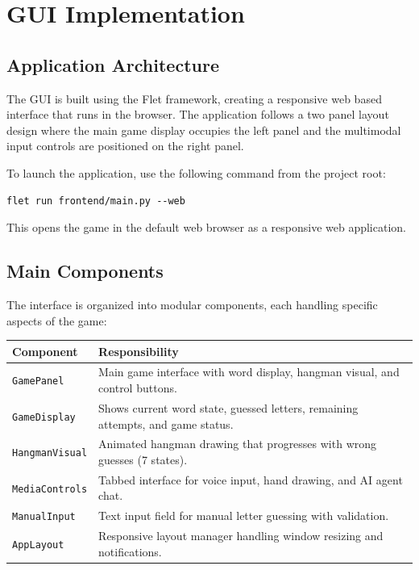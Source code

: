 \section{GUI Implementation}

\subsection*{Application Architecture}

The GUI is built using the Flet framework, creating a responsive web based interface that runs in the browser. The application follows a two panel layout design where the main game display occupies the left panel and the multimodal input controls are positioned on the right panel.

To launch the application, use the following command from the project root:

\begin{lstlisting}[caption={Starting the Frontend Application}]
flet run frontend/main.py --web
\end{lstlisting}

This opens the game in the default web browser as a responsive web application.

\subsection*{Main Components}

The interface is organized into modular components, each handling specific aspects of the game:

\begin{center}
\begin{tabularx}{\linewidth}{@{}lX@{}}
\toprule
\textbf{Component} & \textbf{Responsibility} \\ \midrule
\texttt{GamePanel}        & Main game interface with word display, hangman visual, and control buttons. \\
\texttt{GameDisplay}      & Shows current word state, guessed letters, remaining attempts, and game status. \\
\texttt{HangmanVisual}    & Animated hangman drawing that progresses with wrong guesses (7 states). \\
\texttt{MediaControls}    & Tabbed interface for voice input, hand drawing, and AI agent chat. \\
\texttt{ManualInput}      & Text input field for manual letter guessing with validation. \\
\texttt{AppLayout}        & Responsive layout manager handling window resizing and notifications. \\ \bottomrule
\end{tabularx}
\end{center}

